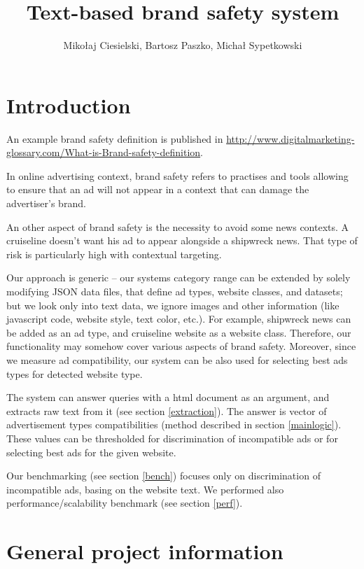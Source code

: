 \documentclass[a4paper]{article}
\begin{document}
\title{Text-based brand safety system}

\author{Mikołaj Ciesielski, Bartosz Paszko, Michał Sypetkowski}
\maketitle

\section{Introduction}

An example brand safety definition is published in
\url{http://www.digitalmarketing-glossary.com/What-is-Brand-safety-definition}.

In online advertising context,
brand safety refers to practises and tools allowing to ensure that
an ad will not appear in a context that can damage the advertiser’s brand.

An other aspect of brand safety is the necessity to avoid some news contexts.
A cruiseline doesn’t want his ad to appear alongside a shipwreck news.
That type of risk is particularly high with contextual targeting.

Our approach is generic -- our systems category range can be extended
by solely modifying JSON data files, that define ad types, website
classes, and datasets; but we look only into text data, we ignore images and other information
(like javascript code, website style, text color, etc.).
For example, shipwreck news can be added as an ad type,
and cruiseline website as a website class.
Therefore, our functionality may somehow cover various aspects of brand safety.
Moreover, since we measure ad compatibility, our system can be also used
for selecting best ads types for detected website type.

The system can answer queries with a html document as an argument,
and extracts raw text from it (see section \ref{extraction}).
The answer is vector of advertisement types compatibilities (method described in section \ref{mainlogic}).
These values can be thresholded for discrimination of incompatible
ads or for selecting best ads for the given website.

Our benchmarking (see section \ref{bench}) focuses only
on discrimination of incompatible ads, basing on the website text.
We performed also performance/scalability benchmark (see section \ref{perf}).



\section{General project information}
\end{document}
